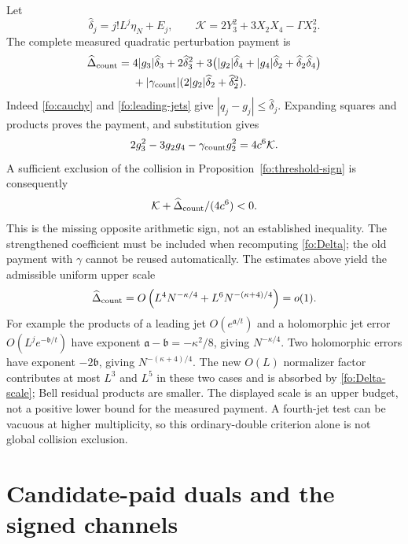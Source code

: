 \documentclass[11pt]{article}
\numberwithin{equation}{section}
\theoremstyle{definition}
\theoremstyle{remark}
\begin{document}
Let
\begin{equation}
\widehat\delta_j=j!L^j\eta_N+E_j,\qquad
\mathcal K=2Y_3^2+3X_2X_4-\Gamma X_2^2.
\label{fo:threshold-K}
\end{equation}
The complete measured quadratic perturbation payment is
\begin{align}
\widehat\Delta_{\rm count}={}&
4|g_3|\widehat\delta_3+2\widehat\delta_3^2
 +3\bigl(|g_2|\widehat\delta_4+|g_4|\widehat\delta_2
                         +\widehat\delta_2\widehat\delta_4\bigr)
 \nonumber\\
&+|\gamma_{\rm count}|
              (2|g_2|\widehat\delta_2+\widehat\delta_2^2).
\label{fo:Delta}
\end{align}
Indeed \eqref{fo:cauchy} and \eqref{fo:leading-jets} give
$|q_j-g_j|\le\widehat\delta_j$.  Expanding squares and products
proves the payment, and substitution gives
\begin{equation}
2g_3^2-3g_2g_4-\gamma_{\rm count}g_2^2=4c^6\mathcal K.
\label{fo:threshold-scaling}
\end{equation}
A sufficient exclusion of the collision in
Proposition~\ref{fo:threshold-sign} is consequently
\begin{equation}
\mathcal K+\widehat\Delta_{\rm count}/(4c^6)<0.
\label{fo:exclusion-target}
\end{equation}
This is the missing opposite arithmetic sign, not an established
inequality.  The strengthened coefficient must be included when
recomputing \eqref{fo:Delta}; the old payment with $\gamma$ cannot
be reused automatically.  The estimates above yield the admissible
uniform upper scale
\begin{equation}
\widehat\Delta_{\rm count}
 =O\left(L^4N^{-\kappa/4}+L^6N^{-(\kappa+4)/4}\right)=o(1).
\label{fo:Delta-scale}
\end{equation}
For example the products of a leading jet $O(e^{\mathfrak a/t})$
and a holomorphic jet error $O(L^je^{-\mathfrak b/t})$ have exponent
$\mathfrak a-\mathfrak b=-\kappa^2/8$, giving $N^{-\kappa/4}$.
Two holomorphic errors have exponent $-2\mathfrak b$, giving
$N^{-(\kappa+4)/4}$.  The new $O(L)$ normalizer factor contributes
at most $L^3$ and $L^5$ in these two cases and is absorbed by
\eqref{fo:Delta-scale}; Bell residual products are smaller.
The displayed scale is an upper budget, not a positive lower bound for
the measured payment.  A fourth-jet test can be vacuous at higher
multiplicity, so this ordinary-double criterion alone is not global
collision exclusion.

\section{Candidate-paid duals and the signed channels}
\label{fo:duals}
\end{document}
